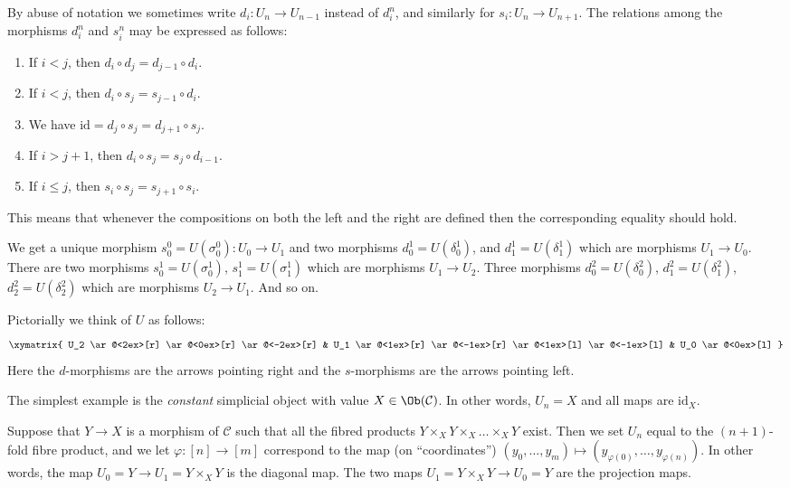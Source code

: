 \begin{remark}
\label{remark-relations}
By abuse of notation we sometimes write $d_i : U_n \to U_{n - 1}$
instead of $d^n_i$, and similarly for $s_i : U_n \to U_{n + 1}$.
The relations among the morphisms $d^n_i$ and $s^n_i$
may be expressed as follows:
\begin{enumerate}
\item If $i < j$, then $d_i \circ d_j = d_{j - 1} \circ d_i$.
\item If $i < j$, then $d_i \circ s_j = s_{j - 1} \circ d_i$.
\item We have $\text{id} = d_j \circ s_j = d_{j + 1} \circ s_j$.
\item If $i > j + 1$, then $d_i \circ s_j = s_j \circ d_{i - 1}$.
\item If $i \leq j$, then $s_i \circ s_j = s_{j + 1} \circ s_i$.
\end{enumerate}
This means that whenever the compositions on both the left and the
right are defined then the corresponding equality should hold.
\end{remark}

\noindent
We get a unique morphism $s^0_0 = U(\sigma^0_0) : U_0 \to U_1$ and
two morphisms $d^1_0 = U(\delta^1_0)$, and
$d^1_1 = U(\delta^1_1)$ which are morphisms $U_1 \to U_0$.
There are two morphisms $s^1_0 = U(\sigma^1_0)$, $s^1_1 = U(\sigma^1_1)$
which are morphisms $U_1 \to U_2$. Three morphisms
$d^2_0 = U(\delta^2_0)$, $d^2_1 = U(\delta^2_1)$, $d^2_2 = U(\delta^2_2)$
which are morphisms $U_2 \to U_1$. And so on.

\medskip\noindent
Pictorially we think of $U$ as follows:
$$
\xymatrix{
U_2
\ar@<2ex>[r]
\ar@<0ex>[r]
\ar@<-2ex>[r]
&
U_1
\ar@<1ex>[r]
\ar@<-1ex>[r]
\ar@<1ex>[l]
\ar@<-1ex>[l]
&
U_0
\ar@<0ex>[l]
}
$$
Here the $d$-morphisms are the arrows pointing right and the
$s$-morphisms are the arrows pointing left.

\begin{example}
\label{example-constant-simplicial-object}
The simplest example is the {\it constant} simplicial object with
value $X \in \Ob(\mathcal{C})$. In other words, $U_n = X$ and
all maps are $\text{id}_X$.
\end{example}

\begin{example}
\label{example-fibre-products-simplicial-object}
Suppose that $Y\to X$ is a morphism of $\mathcal{C}$ such that all
the fibred products $Y \times_X Y \times_X \ldots \times_X Y$ exist.
Then we set $U_n$ equal to the $(n + 1)$-fold fibre product,
and we let $\varphi : [n] \to [m]$ correspond to the map
(on ``coordinates'')
$(y_0, \ldots, y_m) \mapsto (y_{\varphi(0)}, \ldots, y_{\varphi(n)})$.
In other words, the map $U_0 = Y \to U_1 = Y \times_X Y$ is the
diagonal map. The two maps $U_1 = Y \times_X Y \to U_0 = Y$ are the
projection maps.
\end{example}

